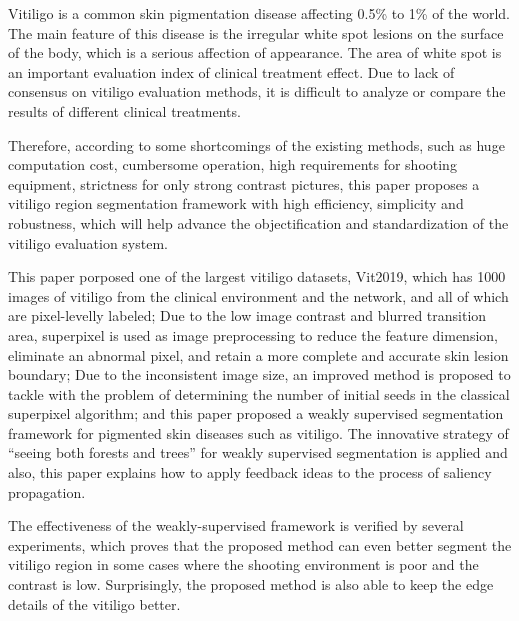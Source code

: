\begin{eabstract}
    Vitiligo is a common skin pigmentation disease affecting 0.5\% to 1\% of the world. The main feature of this disease is the  irregular white spot lesions on the surface of the body, which is a serious affection of appearance. The area of white spot is an important evaluation index of clinical treatment effect. Due to lack of consensus on vitiligo evaluation methods, it is difficult to analyze or compare the results of different clinical treatments.
    
    Therefore, according to some shortcomings of the existing methods, such as huge computation cost, cumbersome operation, high requirements for shooting equipment, strictness for only strong contrast pictures, this paper proposes a vitiligo region segmentation framework with high efficiency, simplicity and robustness, which will help advance the objectification and standardization of the vitiligo evaluation system. 
    
    This paper porposed one of the largest vitiligo datasets, Vit2019, which has 1000 images of vitiligo from the clinical environment and the network, and all of which are pixel-levelly labeled;
    Due to the low image contrast and blurred transition area, superpixel is used as image preprocessing to reduce the feature dimension, eliminate an abnormal pixel, and retain a more complete and accurate skin lesion boundary;
     Due to the inconsistent image size, an improved method is proposed to tackle with the problem of determining the number of initial seeds in the classical superpixel algorithm;
  and this paper proposed a weakly supervised segmentation framework for pigmented skin diseases such as vitiligo. The innovative strategy of “seeing both forests and trees” for weakly supervised segmentation is applied and also, this paper explains how to apply feedback ideas to the process of saliency propagation.
    
   The effectiveness of the weakly-supervised framework is verified by several experiments, which proves that the proposed method can even better segment the vitiligo region in some cases where the shooting environment is poor and the contrast is low. Surprisingly, the proposed method is also able to keep the edge details of the vitiligo better.
    
\end{eabstract}

